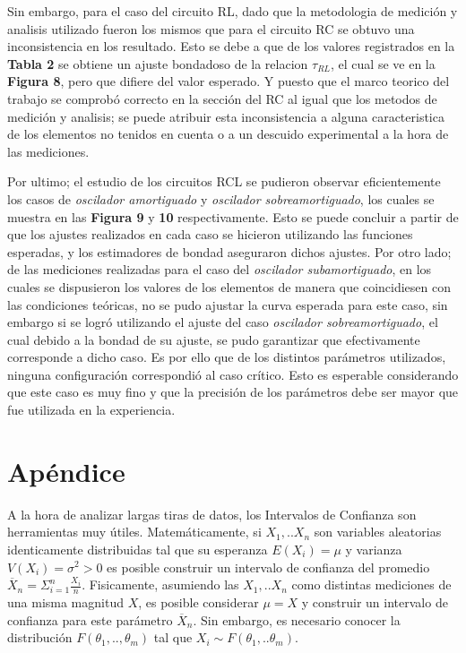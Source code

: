 \documentclass[11pt,a4paper]{article}
\begin{document}
Sin embargo, para el caso del circuito RL, dado que la metodologia de medición y analisis utilizado fueron los mismos que para el circuito RC se obtuvo una inconsistencia en los resultado. Esto se debe a que de los valores registrados en la \textbf{Tabla 2} se obtiene un ajuste bondadoso de la relacion $\tau_{RL}$, el cual se ve en la \textbf{Figura 8}, pero que difiere del valor esperado. Y puesto que el marco teorico del trabajo se comprobó correcto en la sección del RC al igual que los metodos de medición y analisis; se puede atribuir esta inconsistencia a alguna caracteristica de los elementos no tenidos en cuenta o a un descuido experimental a la hora de las mediciones.

Por ultimo; el estudio de los circuitos RCL se pudieron observar eficientemente los casos de \textit{oscilador amortiguado} y \textit{oscilador sobreamortiguado}, los cuales se muestra en las \textbf{Figura 9} y \textbf{10} respectivamente. Esto se puede concluir a partir de que los ajustes realizados en cada caso se hicieron utilizando las funciones esperadas, y los estimadores de bondad aseguraron dichos ajustes. Por otro lado; de las mediciones realizadas para el caso del \textit{oscilador subamortiguado}, en los cuales se dispusieron los valores de los elementos de manera que coincidiesen con las condiciones teóricas, no se pudo ajustar la curva esperada para este caso, sin embargo si se logró utilizando el ajuste del caso \textit{oscilador sobreamortiguado}, el cual debido a la bondad de su ajuste, se pudo garantizar que efectivamente corresponde a dicho caso. Es por ello que de los distintos parámetros utilizados, ninguna configuración correspondió al caso crítico. Esto es esperable considerando que este caso es muy fino y que la precisión de los parámetros debe ser mayor que fue utilizada en la experiencia.



\section{Apéndice}
\label{sec:apendice}

A la hora de analizar largas tiras de datos, los Intervalos de Confianza son herramientas muy útiles. Matemáticamente, si $X_1,..X_n$ son variables aleatorias identicamente distribuidas tal que su esperanza $E(X_i) = \mu$ y varianza $V(X_i) = \sigma^2 > 0$ es posible construir un intervalo de confianza del promedio $\overline{X}_n = \Sigma_{i=1}^{n} \frac{X_i}{n}$. Fisicamente, asumiendo las $X_1,..X_n$ como distintas mediciones de una misma magnitud $X$, es posible considerar $\mu = X$ y construir un intervalo de confianza para este parámetro $\overline{X}_n$. Sin embargo, es necesario conocer la distribución $F(\theta_1,..,\theta_m)$ tal que $X_i \sim F(\theta_1,..\theta_m)$. 
\end{document}
